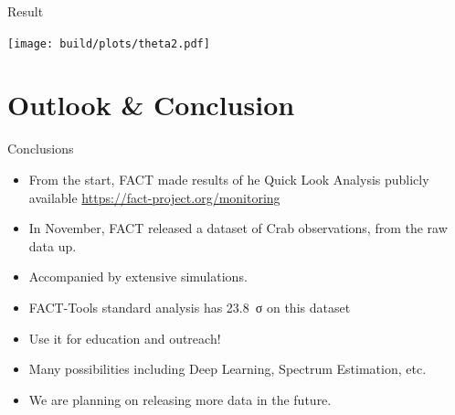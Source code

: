 \documentclass[compress, 9pt, aspectratio=1610, professionalfonts]{beamer}
\begin{document}
\begin{frame}[t]{Result}
  \begin{center}
    \texttt{[image: build/plots/theta2.pdf]}
  \end{center}
\end{frame}

\section{Outlook \& Conclusion}

\begin{frame}[c]{Conclusions}
  \begin{itemize}
    \item From the start, FACT made results of he Quick Look Analysis publicly available \url{https://fact-project.org/monitoring}
    \item In November, FACT released a dataset of Crab observations, from the raw data up.
    \item Accompanied by extensive simulations.
    \item FACT-Tools standard analysis has \SI{23.8}{σ} on this dataset
    \item Use it for education and outreach!
    \item Many possibilities including Deep Learning, Spectrum Estimation, etc.
    \item We are planning on releasing more data in the future.
  \end{itemize}
\end{frame}
\end{document}

